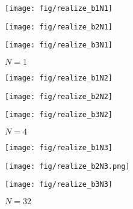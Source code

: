 \documentclass[a4paper,14pt]{extarticle}
\begin{document}
 \begin{figure}[H]
	\begin{minipage}{0.3\linewidth}
		\centering
        \texttt{[image: fig/realize\_b1N1]}
		\caption*{$\beta =0.8$}
	\end{minipage}
	\begin{minipage}{0.3\linewidth}
		\centering
        \texttt{[image: fig/realize\_b2N1]}
		\caption*{$\beta =0.95$}
	\end{minipage}
	\begin{minipage}{0.3\linewidth}
		\centering
        \texttt{[image: fig/realize\_b3N1]}
		\caption*{$\beta =0.98$}
	\end{minipage}
\caption*{$N=1$}
\end{figure}

 \begin{figure}[H]
	\begin{minipage}{0.3\linewidth}
		\centering
        \texttt{[image: fig/realize\_b1N2]}
		\caption*{$\beta =0.8$}
	\end{minipage}
	\begin{minipage}{0.3\linewidth}
		\centering
        \texttt{[image: fig/realize\_b2N2]}
		\caption*{$\beta =0.95$}
	\end{minipage}
	\begin{minipage}{0.3\linewidth}
		\centering
        \texttt{[image: fig/realize\_b3N2]}
        \caption*{$\beta =0.98$}
	\end{minipage}
	\caption*{$N=4$}
	
\end{figure}
 \begin{figure}[H]
	\begin{minipage}{0.3\linewidth}
		\centering
        \texttt{[image: fig/realize\_b1N3]}
		\caption*{$\beta =0.8$}
	\end{minipage}
	\begin{minipage}{0.3\linewidth}
		\centering
        \texttt{[image: fig/realize\_b2N3.png]}
		\caption*{$\beta =0.95$}
	\end{minipage}
	\begin{minipage}{0.3\linewidth}
		\centering
        \texttt{[image: fig/realize\_b3N3]}
		\caption*{$\beta =0.98$}
	\end{minipage}
	\caption*{$N=32$}
\end{figure}
\end{document}

